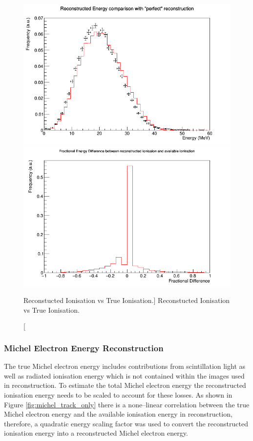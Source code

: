 \begin{figure}
	\centering
	\includegraphics[width=\textwidth]{figures/reco_v_ion.png}
	\includegraphics[width=\textwidth]{figures/reco_v_ion_delta.png}
	\caption
	[Reconstucted Ionisation vs True Ionisation.]
	{Reconstucted Ionisation vs True Ionisation.}
	\label{fig:reco_v_ion}
\end{figure}

\subsubsection{Michel Electron Energy Reconstruction}

The true Michel electron energy includes contributions from scintillation light
as well as radiated ionisation energy which is not contained within the images
used in reconstruction. To estimate the total Michel electron energy the
reconstructed ionisation energy needs to be scaled to account for these losses.
As shown in Figure \ref{fig:michel_track_only} there is a none--linear
correlation between the true Michel electron energy and the available ionisation
energy in reconstruction, therefore, a quadratic energy scaling factor was used
to convert the reconstructed ionisation energy into a reconstructed Michel
electron energy. 

